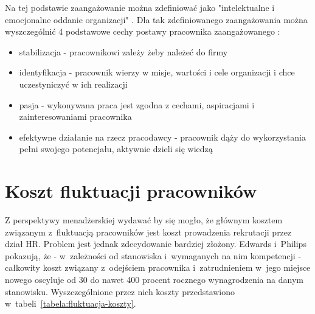 Na tej podstawie zaangażowanie można zdefiniować jako "intelektualne i emocjonalne oddanie organizacji" \cite{juchnowicz-2010}.
Dla tak zdefiniowanego zaangażowania można wyszczególnić 4 podstawowe cechy postawy pracownika zaangażowanego \cite{juchnowicz-2010}:
\begin{itemize}
    \item stabilizacja - pracownikowi zależy żeby należeć do firmy
    \item identyfikacja - pracownik wierzy w misje, wartości i cele organizacji i chce uczestyniczyć w ich realizacji
    \item pasja - wykonywana praca jest zgodna z cechami, aspiracjami i zainteresowaniami pracownika
    \item efektywne działanie na rzecz pracodawcy - pracownik dąży do wykorzystania pełni swojego potencjału, aktywnie dzieli się wiedzą
\end{itemize}



\section{Koszt fluktuacji pracowników}\label{sec:koszt-fluktuacji}

Z perspektywy menadżerskiej wydawać by się mogło, że głównym kosztem związanym z~fluktuacją pracowników jest koszt prowadzenia rekrutacji przez dział HR.
Problem jest jednak zdecydowanie bardziej złożony.
Edwards i~Philips \cite{philips-edwards-2009} pokazują, że - w~zależności od stanowiska i~wymaganych na nim kompetencji -
całkowity koszt związany z~odejściem pracownika i~zatrudnieniem w~jego miejsce nowego oscyluje od 30 do nawet 400 procent
rocznego wynagrodzenia na danym stanowisku. Wyszczególnione przez nich koszty przedstawiono w~tabeli~\ref{tabela:fluktuacja-koszty}.


